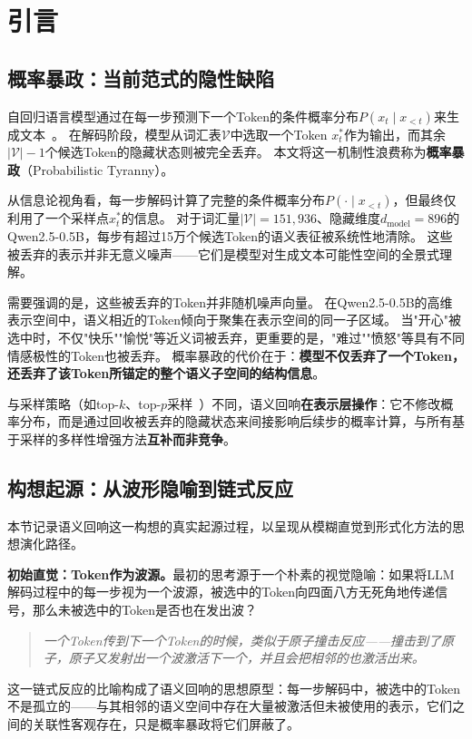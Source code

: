 \documentclass[a4paper, 11pt]{article}
\begin{document}
\section{引言}

\subsection{概率暴政：当前范式的隐性缺陷}

自回归语言模型通过在每一步预测下一个Token的条件概率分布$P(x_t \mid x_{<t})$来生成文本~\cite{vaswani2017attention, brown2020language}。
在解码阶段，模型从词汇表$\mathcal{V}$中选取一个Token $x_t^*$作为输出，而其余$|\mathcal{V}|-1$个候选Token的隐藏状态则被完全丢弃。
本文将这一机制性浪费称为\textbf{概率暴政}（Probabilistic Tyranny）。

从信息论视角看，每一步解码计算了完整的条件概率分布$P(\cdot \mid x_{<t})$，但最终仅利用了一个采样点$x_t^*$的信息。
对于词汇量$|\mathcal{V}|=151{,}936$、隐藏维度$d_{\text{model}}=896$的Qwen2.5-0.5B，每步有超过15万个候选Token的语义表征被系统性地清除。
这些被丢弃的表示并非无意义噪声——它们是模型对生成文本可能性空间的全景式理解。

需要强调的是，这些被丢弃的Token并非随机噪声向量。
在Qwen2.5-0.5B的高维表示空间中，语义相近的Token倾向于聚集在表示空间的同一子区域。
当"开心"被选中时，不仅"快乐""愉悦"等近义词被丢弃，更重要的是，"难过""愤怒"等具有不同情感极性的Token也被丢弃。
概率暴政的代价在于：\textbf{模型不仅丢弃了一个Token，还丢弃了该Token所锚定的整个语义子空间的结构信息}。

与采样策略（如top-$k$、top-$p$采样~\cite{holtzman2020curious}）不同，语义回响\textbf{在表示层操作}：它不修改概率分布，而是通过回收被丢弃的隐藏状态来间接影响后续步的概率计算，与所有基于采样的多样性增强方法\textbf{互补而非竞争}。

\subsection{构想起源：从波形隐喻到链式反应}

本节记录语义回响这一构想的真实起源过程，以呈现从模糊直觉到形式化方法的思想演化路径。

\textbf{初始直觉：Token作为波源。}最初的思考源于一个朴素的视觉隐喻：如果将LLM解码过程中的每一步视为一个波源，被选中的Token向四面八方无死角地传递信号，那么未被选中的Token是否也在发出波？
\begin{quote}\small\itshape
一个Token传到下一个Token的时候，类似于原子撞击反应——撞击到了原子，原子又发射出一个波激活下一个，并且会把相邻的也激活出来。
\end{quote}
这一链式反应的比喻构成了语义回响的思想原型：每一步解码中，被选中的Token不是孤立的——与其相邻的语义空间中存在大量被激活但未被使用的表示，它们之间的关联性客观存在，只是概率暴政将它们屏蔽了。
\end{document}
